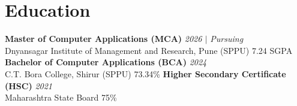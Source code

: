 \documentclass[10.5pt,a4paper]{article}
\begin{document}
\section{Education}
\textbf{Master of Computer Applications (MCA)} \hfill \textit{2026 $|$ Pursuing}\\
Dnyansagar Institute of Management and Research, Pune (SPPU) \hfill 7.24 SGPA
\vspace{2pt}
\textbf{Bachelor of Computer Applications (BCA)} \hfill \textit{2024}\\
C.T. Bora College, Shirur (SPPU) \hfill 73.34\%
\vspace{2pt}
\textbf{Higher Secondary Certificate (HSC)} \hfill \textit{2021}\\
Maharashtra State Board \hfill 75\%
\vspace{2pt}
\end{document}
